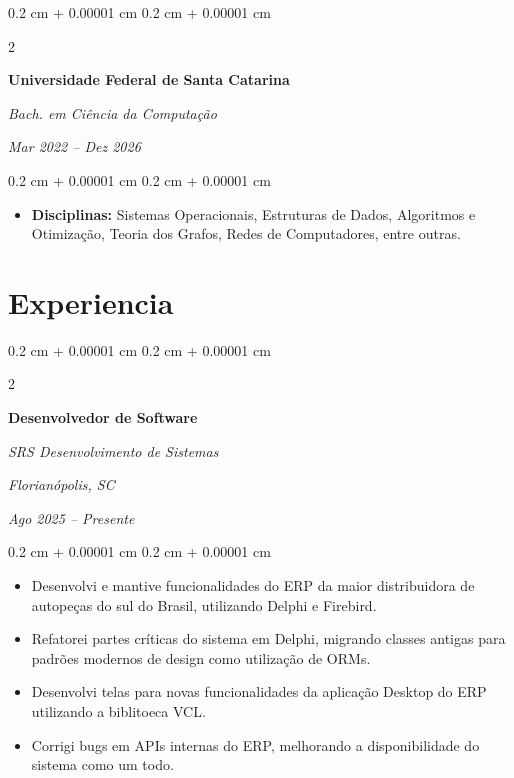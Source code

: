\documentclass[10pt, letterpaper]{article}
\newenvironment{highlights}{
    \begin{itemize}[
        topsep=0.10 cm,
        parsep=0.10 cm,
        partopsep=0pt,
        itemsep=0pt,
        leftmargin=0.4 cm + 10pt
    ]
}{
    \end{itemize}
} %
\newenvironment{onecolentry}{
    \begin{adjustwidth}{
        0.2 cm + 0.00001 cm
    }{
        0.2 cm + 0.00001 cm
    }
}{
    \end{adjustwidth}
} %
\newenvironment{twocolentry}[2][]{
    \onecolentry
    \def\secondColumn{#2}
    \setcolumnwidth{\fill, 4.5 cm}
    \begin{paracol}{2}
}{
    \switchcolumn \raggedleft \secondColumn
    \end{paracol}
    \endonecolentry
} %
\begin{document}
        
        \begin{twocolentry}{
            
            
        \textit{Mar 2022 – Dez 2026}}
            \textbf{Universidade Federal de Santa Catarina}

            \textit{Bach. em Ciência da Computação}
        \end{twocolentry}

        \vspace{0.10 cm}
        \begin{onecolentry}
            \begin{highlights}
                \item \textbf{Disciplinas:} Sistemas Operacionais, Estruturas de Dados, Algoritmos e Otimização, Teoria dos Grafos, Redes de Computadores, entre outras.
            \end{highlights}
        \end{onecolentry}



    
    \section{Experiencia}



        
        \begin{twocolentry}{
        \textit{Florianópolis, SC}    
            
        \textit{Ago 2025 – Presente}}
            \textbf{Desenvolvedor de Software}
            
            \textit{SRS Desenvolvimento de Sistemas}
        \end{twocolentry}

        \vspace{0.10 cm}
        \begin{onecolentry}
            \begin{highlights}
                \item Desenvolvi e mantive funcionalidades do ERP da maior distribuidora de autopeças do sul do Brasil, utilizando Delphi e Firebird.
                \item Refatorei partes críticas do sistema em Delphi, migrando classes antigas para padrões modernos de design como utilização de ORMs.
                \item Desenvolvi telas para novas funcionalidades da aplicação Desktop do ERP utilizando a biblitoeca VCL.
                \item Corrigi bugs em APIs internas do ERP, melhorando a disponibilidade do sistema como um todo.
                
            \end{highlights}
        \end{onecolentry}
\end{document}
